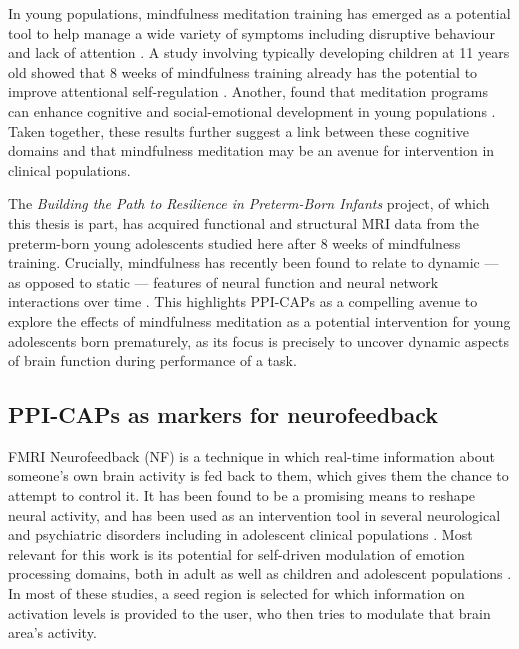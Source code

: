 In young populations, mindfulness meditation training has emerged as a potential tool to help manage a wide variety of symptoms including disruptive behaviour \citep{Perry-Parrish2016} and lack of attention \citep{Zhang2018}. A study involving typically developing children at 11 years old showed that 8 weeks of mindfulness training already has the potential to improve attentional self-regulation \citep{Felver2017}. Another, found that meditation programs can enhance cognitive and social-emotional development in young populations \citep{Schonert-Reichl2015}. Taken together, these results further suggest a link between these cognitive domains and that mindfulness meditation may be an avenue for intervention in clinical populations.


The \textit{Building the Path to Resilience in Preterm-Born Infants} project, of which this thesis is part, has acquired functional and structural MRI data from the preterm-born young adolescents studied here after 8 weeks of mindfulness training. Crucially, mindfulness has recently been found to relate to dynamic --- as opposed to static --- features of neural function and neural network interactions over time \citep{Marusak2018}. This highlights PPI-CAPs as a compelling avenue to explore the effects of mindfulness meditation as a potential intervention for young adolescents born prematurely, as its focus is precisely to uncover dynamic aspects of brain function during performance of a task.  





\subsection*{PPI-CAPs as markers for neurofeedback} 
FMRI Neurofeedback (NF) is a technique in which real-time information about someone's own brain activity is fed back to them, which gives them  the chance to attempt to control it. It has been found to be a promising means to reshape neural activity, and has been used as an intervention tool in several neurological and psychiatric disorders \citep{Guntensperger2017, Misaki2019} including in adolescent clinical populations \citep{Alegria2017}. Most relevant for this work is its potential for self-driven modulation of emotion processing domains, both in adult \citep{Koush2017,Lorenzetti2018} as well as children and adolescent populations \citep{CohenKadosh2016}. In most of these studies, a seed region is selected for which information on activation levels is provided to the user, who then tries to modulate that brain area's activity. 

